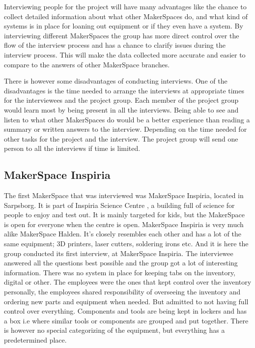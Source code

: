 Interviewing people for the project will have many advantages like the chance to collect detailed information about what other MakerSpaces do, and what kind of systems is in place for loaning out equipment or if they even have a system. By interviewing different MakerSpaces the group has more direct control over the flow of the interview process and has a chance to clarify issues during the interview process. This will make the data collected more accurate and easier to compare to the answers of other MakerSpace branches.

There is however some disadvantages of conducting interviews. One of the disadvantages is the time needed to arrange the interviews at appropriate times for the interviewees and the project group. Each member of the project group would learn most by being present in all the interviews. Being able to see and listen to what other MakerSpaces do would be a better experience than reading a summary or written answers to the interview. Depending on the time needed for other tasks for the project and the interview. The project group will send one person to all the interviews if time is limited.  

\subsection{MakerSpace Inspiria}

The first MakerSpace that was interviewed was MakerSpace Inspiria, located in Sarpsborg. It is part of Inspiria Science Centre \cite{Inspiria-SC}, a building full of science for people to enjoy and test out. It is mainly targeted for kids, but the MakerSpace is open for everyone when the centre is open. MakerSpace Inspiria is very much alike MakerSpace Halden. It's closely resembles each other and has a lot of the same equipment; 3D printers, laser cutters, soldering irons etc. 
And it is here the group conducted its first interview, at MakerSpace Inspiria. The interviewee answered all the questions best possible and the group got a lot of interesting information. There was no system in place for keeping tabs on the inventory, digital or other. The employees were the ones that kept control over the inventory personally, the employees shared responsibility of overseeing the inventory and ordering new parts and equipment when needed. But admitted to not having full control over everything. Components and tools are being kept in lockers and has a box i.e where similar tools or components are grouped and put together. There is however no special categorizing of the equipment, but everything has a predetermined place. 

